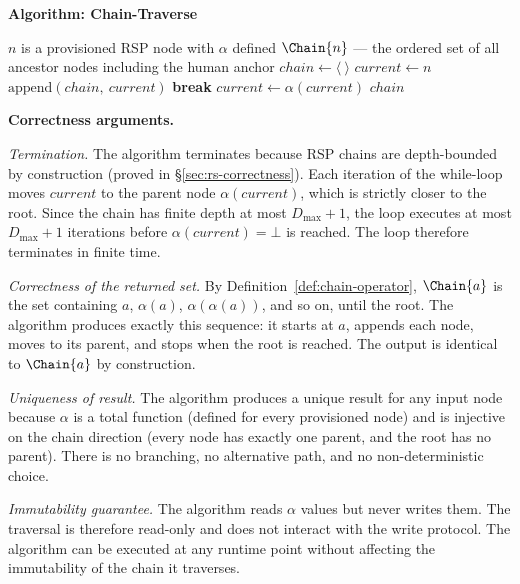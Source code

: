 \medskip
\noindent\textbf{Algorithm: Chain-Traverse}

\begin{algorithm}
\caption{Chain-Traverse($n$) --- Build the delegation chain from node $n$ to the human anchor}
\label{alg:chain-traverse}
\begin{algorithmic}[1]
\REQUIRE $n$ is a provisioned RSP node with $\alpha$ defined
\ENSURE $\Chain{n}$ --- the ordered set of all ancestor nodes including the human anchor
\STATE $chain \leftarrow \langle\ \rangle$ 
\STATE $current \leftarrow n$ 
    \STATE $\text{append}(chain,\ current)$ 
        \STATE \textbf{break} 
    \ENDIF
    \STATE $current \leftarrow \alpha(current)$ 
\ENDWHILE
\RETURN $chain$
\end{algorithmic}
\end{algorithm}

\medskip
\noindent\textbf{Correctness arguments.}

\textit{Termination.} The algorithm terminates because RSP chains are depth-bounded by construction (proved in \S\ref{sec:rs-correctness}). Each iteration of the while-loop moves $current$ to the parent node $\alpha(current)$, which is strictly closer to the root. Since the chain has finite depth at most $D_{\max} + 1$, the loop executes at most $D_{\max} + 1$ iterations before $\alpha(current) = \bot$ is reached. The loop therefore terminates in finite time.

\textit{Correctness of the returned set.} By Definition~\ref{def:chain-operator}, $\Chain{a}$ is the set containing $a$, $\alpha(a)$, $\alpha(\alpha(a))$, and so on, until the root. The algorithm produces exactly this sequence: it starts at $a$, appends each node, moves to its parent, and stops when the root is reached. The output is identical to $\Chain{a}$ by construction.

\textit{Uniqueness of result.} The algorithm produces a unique result for any input node because $\alpha$ is a total function (defined for every provisioned node) and is injective on the chain direction (every node has exactly one parent, and the root has no parent). There is no branching, no alternative path, and no non-deterministic choice.

\textit{Immutability guarantee.} The algorithm reads $\alpha$ values but never writes them. The traversal is therefore read-only and does not interact with the write protocol. The algorithm can be executed at any runtime point without affecting the immutability of the chain it traverses.

